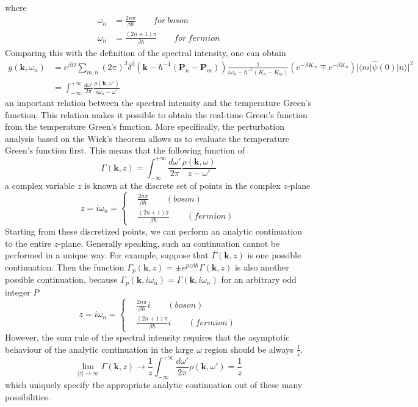 where
\[
\begin{aligned}
\omega_n&=\frac{2n\pi}{\beta\hbar} \qquad for \ boson\\
\omega_n&=\frac{(2n+1)\pi}{\beta\hbar} \qquad for \ fermion
\end{aligned}
\]
Comparing this with the definition of the spectral intensity, one can obtain
\begin{equation}
\begin{aligned}
g(\mathbf{k},\omega_n)&=e^{\beta\Omega} \sum_{m,n} (2\pi)^3 \delta^3(\mathbf k-\hbar^{-1}(\mathbf P_n -\mathbf P_m)) \frac{1}{i\omega_n-\hbar^{-1}(K_n-K_m)} \left( e^{-\beta K_m} \mp e^{-\beta K_n} \right) |\langle m|\hat \psi (0)|n\rangle|^2 \\
&=\int_{-\infty}^{+\infty} \frac{d\omega'}{2\pi} \frac{\rho(\mathbf k,\omega')}{i\omega_n-\omega'}
\end{aligned}
\end{equation}
an important relation between the spectral intensity and the temperature Green's function.
 This relation makes it possible to obtain the real-time Green's function from the temperature Green's function.
 More specifically, the perturbation analysis based on the Wick's theorem allows us to evaluate the temperature Green's function first.
 This means that the following function of 
\begin{equation}
\Gamma(\mathbf k,z)=\int _{-\infty}^{+\infty} \frac{d\omega'}{2\pi} \frac{\rho(\mathbf k,\omega)}{z-\omega'}
\end{equation}
a complex variable $z$ is known at the discrete set of points in the complex $z$-plane
\[
z=i\omega_n=
\left\{
\begin{aligned}
&\frac{2n\pi}{\beta\hbar}\qquad (boson)\\
&\frac{(2n+1)\pi}{\beta\hbar} \qquad (fermion)
\end{aligned}
\right.
\]
 Starting from these discretized points, we can perform an analytic continuation to the entire $z$-plane.
 Generally speaking, such an continuation cannot be performed in a unique way.
 For example, suppose that $\Gamma(\mathbf k,z)$ is one possible continuation.
 Then the function $\Gamma_p(\mathbf k,z)=\pm e^{p z \beta \hbar}\Gamma(\mathbf k,z)$ is also another possible continuation, because $\Gamma_p(\mathbf k,i\omega_n)=\Gamma(\mathbf k,i\omega_n)$ for an arbitrary odd integer $P$
\[
z=i\omega_n=
\left\{
\begin{aligned}
&\frac{2n\pi}{\beta\hbar}i\qquad (boson)\\
&\frac{(2n+1)\pi}{\beta\hbar}i \qquad (fermion)
\end{aligned}
\right.
\]
 However, the sum rule of the spectral intensity requires that the asymptotic behaviour of the analytic continuation in the large $\omega$ region should be always $\frac{1}{z}$.
\[
\lim_{|z|\to \infty} \Gamma(\mathbf k,z) \to \frac{1}{z} \int_{-\infty}^{+\infty} \frac{d\omega'}{2\pi} \rho(\mathbf k,\omega') =\frac{1}{z}
\]
which uniquely specify the appropriate analytic continuation out of these many possibilities.








